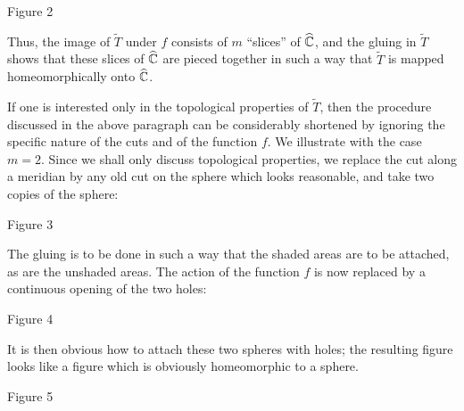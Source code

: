 \documentclass[a4paper,11pt]{article}
\begin{document}
\begin{mdframed}
  \vspace{3.5cm}

  Figure 2
\end{mdframed}

Thus, the image of $\widetilde{T}$ under $f$ consists of $m$
``slices'' of $\widehat{{\mathbb C}}$, and the gluing in $\widetilde{T}$
shows that these slices of $\widehat{{\mathbb C}}$ are pieced together in
such a way that $\widetilde{T}$ is mapped homeomorphically onto
$\widehat{{\mathbb C}}$.

If one is interested only in the topological properties of
$\widetilde{T}$, then the procedure discussed in the above paragraph
can be considerably shortened by ignoring the specific nature of the
cuts and of the function $f$.  We illustrate with the case
$m=2$. Since we shall only discuss topological properties, we replace
the cut along a meridian by any old cut on the sphere which looks
reasonable, and take two copies of the sphere:

\begin{mdframed}
  \vspace{3.5cm}

  Figure 3
\end{mdframed}

The gluing is to be done in such a way that the shaded areas are to be
attached, as are the unshaded areas.  The action of the function $f$
is now replaced by a continuous opening of the two holes:

\begin{mdframed}
  \vspace{3.5cm}

  Figure 4
\end{mdframed}

It is then obvious how to attach these two spheres with holes;  the
resulting figure looks like a figure which is obviously homeomorphic
to a sphere.

\begin{mdframed}
  \vspace{3cm}

  Figure 5

\end{mdframed}
\end{document}
